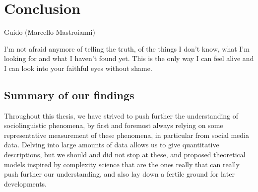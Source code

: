 \documentclass[../thesis.tex]{subfiles}
\begin{document}
\chapter{Conclusion}
\label{ch:conclusion}

\epigraph{
  \begin{center}
    \textnormal{Guido (Marcello Mastroianni)}\\
  \end{center}
  I'm not afraid anymore of telling the truth, of the things I don't know, what I'm
  looking for and what I haven't found yet. This is the only way I can feel alive and I
  can look into your faithful eyes without shame.
}{
}


\section{Summary of our findings}
Throughout this thesis, we have strived to push further the understanding of
sociolinguistic phenomena, by first and foremost always relying on some representative
measurement of these phenomena, in particular from social media data. Delving into large
amounts of data allows us to give quantitative descriptions, but we should and did not
stop at these, and proposed theoretical models inspired by complexity science that are
the ones really that can really push further our understanding, and also lay down a
fertile ground for later developments.
\end{document}
